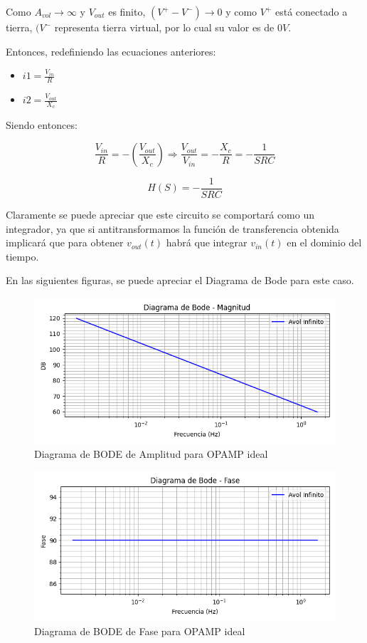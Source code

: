 Como ${A_{vol} \to \infty}$ y $V_{out}$ es finito, ${(V^{+}-V^{-}) \to 0}$ y como $V^{+}$ está conectado a tierra,
$(V^{-}$ representa tierra virtual, por lo cual su valor es de $0V$.

Entonces, redefiniendo las ecuaciones anteriores:

\begin{itemize}
	\item $i1 = \frac{V_{in}}{R} $
	\item $i2 = \frac {V_{out}}{X_c}$
\end{itemize}

Siendo entonces:

$$ \frac{V_{in}}{R} = - (\frac{V_{out}}{X_c}) \Longrightarrow \frac{V_{out}}{V_{in}} = -\frac{X_c}{R} = - \frac{1}{SRC}$$

$$ H(S) = - \frac{1}{SRC}$$

Claramente se puede apreciar que este circuito se comportará como un integrador, ya que si antitransformamos la función de transferencia
obtenida implicará que para obtener $v_{out}(t)$ habrá que integrar $v_{in}(t)$ en el dominio del tiempo.

En las siguientes figuras, se puede apreciar el Diagrama de Bode para este caso.

\begin{figure}[H]
    \centering 
    \includegraphics [scale=1] {../Ejercicio3-CircuitoIntegradoresyDerivadores/Imagenes/diagrama-bode-ideal-amplitud.png} 
    \caption{Diagrama de BODE de Amplitud para OPAMP ideal}
    \label{fig:emptyPlotTool}
\end{figure}

\begin{figure}[H]
    \centering 
    \includegraphics [scale=1] {../Ejercicio3-CircuitoIntegradoresyDerivadores/Imagenes/diagrama-bode-ideal-fase.png} 
    \caption{Diagrama de BODE de Fase para OPAMP ideal}
    \label{fig:emptyPlotTool}
\end{figure}

